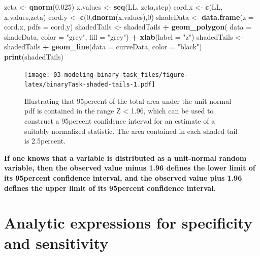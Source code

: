 \documentclass[
]{book}
\newenvironment{Shaded}{\begin{snugshade}}{\end{snugshade}}
\newcommand{\DataTypeTok}[1]{\textcolor[rgb]{0.13,0.29,0.53}{#1}}
\newcommand{\DecValTok}[1]{\textcolor[rgb]{0.00,0.00,0.81}{#1}}
\newcommand{\FloatTok}[1]{\textcolor[rgb]{0.00,0.00,0.81}{#1}}
\newcommand{\KeywordTok}[1]{\textcolor[rgb]{0.13,0.29,0.53}{\textbf{#1}}}
\newcommand{\NormalTok}[1]{#1}
\newcommand{\OperatorTok}[1]{\textcolor[rgb]{0.81,0.36,0.00}{\textbf{#1}}}
\newcommand{\StringTok}[1]{\textcolor[rgb]{0.31,0.60,0.02}{#1}}
\begin{document}
\begin{Shaded}
\begin{Highlighting}[]
\NormalTok{zeta \textless{}{-}}\StringTok{ }\KeywordTok{qnorm}\NormalTok{(}\FloatTok{0.025}\NormalTok{)}
\NormalTok{x.values \textless{}{-}}\StringTok{ }\KeywordTok{seq}\NormalTok{(LL, zeta,step)}
\NormalTok{cord.x \textless{}{-}}\StringTok{ }\KeywordTok{c}\NormalTok{(LL, x.values,zeta) }
\NormalTok{cord.y \textless{}{-}}\StringTok{ }\KeywordTok{c}\NormalTok{(}\DecValTok{0}\NormalTok{,}\KeywordTok{dnorm}\NormalTok{(x.values),}\DecValTok{0}\NormalTok{) }
\NormalTok{shadeData \textless{}{-}}\StringTok{ }\KeywordTok{data.frame}\NormalTok{(}\DataTypeTok{z =}\NormalTok{ cord.x, }\DataTypeTok{pdfs =}\NormalTok{ cord.y)}
\NormalTok{shadedTails \textless{}{-}}\StringTok{ }\NormalTok{shadedTails }\OperatorTok{+}\StringTok{ }
\StringTok{  }\KeywordTok{geom\_polygon}\NormalTok{(}
    \DataTypeTok{data =}\NormalTok{ shadeData, }\DataTypeTok{color =} \StringTok{"grey"}\NormalTok{, }\DataTypeTok{fill =} \StringTok{"grey"}\NormalTok{) }\OperatorTok{+}\StringTok{ }
\StringTok{  }\KeywordTok{xlab}\NormalTok{(}\DataTypeTok{label =} \StringTok{"z"}\NormalTok{) }
\NormalTok{shadedTails \textless{}{-}}\StringTok{ }\NormalTok{shadedTails }\OperatorTok{+}\StringTok{ }
\StringTok{  }\KeywordTok{geom\_line}\NormalTok{(}\DataTypeTok{data =}\NormalTok{ curveData, }\DataTypeTok{color =} \StringTok{"black"}\NormalTok{)}
\KeywordTok{print}\NormalTok{(shadedTails)}
\end{Highlighting}
\end{Shaded}

\begin{figure}
\centering
\texttt{[image: 03-modeling-binary-task\_files/figure-latex/binaryTask-shaded-tails-1.pdf]}
\caption{\label{fig:binaryTask-shaded-tails}Illustrating that 95percent of the total area under the unit normal pdf is contained in the range \textbar Z\textbar{} \textless{} 1.96, which can be used to construct a 95percent confidence interval for an estimate of a suitably normalized statistic. The area contained in each shaded tail is 2.5percent.}
\end{figure}

\textbf{If one knows that a variable is distributed as a unit-normal random variable, then the observed value minus 1.96 defines the lower limit of its 95percent confidence interval, and the observed value plus 1.96 defines the upper limit of its 95percent confidence interval.}

\hypertarget{analytic-expressions-for-specificity-and-sensitivity}{%
\section{Analytic expressions for specificity and sensitivity}\label{analytic-expressions-for-specificity-and-sensitivity}}
\end{document}
